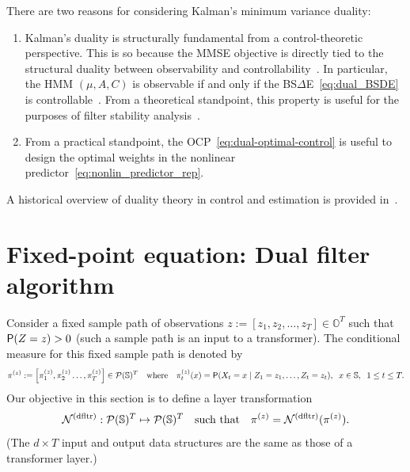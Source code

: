 \documentclass[twoside,11pt]{article}
\def\clP{{\cal P}}
\def\bS{\begin{slide}}
\def\clP{{\cal P}}
\def\clP{{\cal P}}
\def\bS{\mathbb{S}}
\def\bO{\mathbb{O}}
\def\sP{{\sf P}}
\def\dfltr{{\text{\rm (dfltr)}}}
\begin{document}
There are two reasons for considering Kalman's minimum variance duality:
\begin{enumerate}
  \label{enum:kalman_duality}
  \item Kalman's duality is structurally fundamental from a
    control-theoretic perspective.  This is so because the MMSE objective
    is directly tied to the structural duality between observability and controllability~\citep[Ch.~8]{callier2012linear}. 
  In particular, the HMM $(\mu,A,C)$ is observable if and only if the BS$\Delta$E~\eqref{eq:dual_BSDE} is controllable~\citep{duality_jrnl_paper_I}.
  From a theoretical standpoint, this property is useful for the
  purposes of filter stability
  analysis~\citep{kim2024variance,kim2024backward}.  
  \item From a practical standpoint, the OCP~\eqref{eq:dual-optimal-control} is useful to design the optimal weights in the nonlinear predictor~\eqref{eq:nonlin_predictor_rep}.  
\end{enumerate}
A historical overview of duality theory
in control and estimation is provided in~\citep{kim2025arrow}.


\section{Fixed-point equation: Dual filter algorithm}
\label{sec:algorithm}

Consider a fixed sample path of observations ${z}:=[z_1,z_2,\hdots,z_T]
\in \bO^T$ such that $\sP(Z=z)>0$ (such a sample path is an input to a
transformer).  The conditional measure for this fixed sample path is
denoted by
\begin{equation*}
\pi^{(z)} := \left[\pi_1^{(z)}, \pi_2^{(z)}\hdots,
  \pi_{T}^{(z)}\right]\in\clP(\bS)^T  \quad \text{where}\quad  \pi_t^{(z)}(x)=\sP(X_t = x \mid
Z_1=z_1,\hdots,Z_t=z_t),\;\; x\in\bS, \;\; 1\leq t\leq T.
\end{equation*}
Our objective in this section is to define a layer transformation
\begin{equation*}
  {\cal N}^\dfltr:\clP(\bS)^T \mapsto \clP(\bS)^T\quad
  \text{such that}\quad \pi^{(z)} = {\cal N}^\dfltr(\pi^{(z)}).
\end{equation*}
(The $d\times T$ input and output data structures are the same as those
of a transformer layer.)
\end{document}
